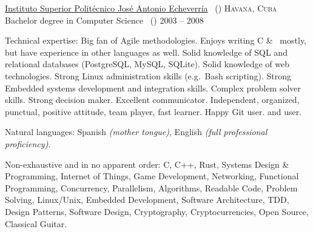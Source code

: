 \documentclass[10pt,a4paper]{article}
\begin{document}
                \headedsection
                        {\href{http://cujae.edu.cu}{Instituto Superior Polit\'ecnico Jos\'e Antonio Echeverr\'ia} \textnormal{~()}}
                        {\textsc{Havana, Cuba}} {%
                            \headedsubsection
                                    {Bachelor degree in Computer Science \textnormal{~()}}
                                    {2003 -- 2008}
                                    {}
                        }

                        \spacedhrule{0.5em}{-0.4em}


                        \inlineheadsection  %
                                {Technical expertise:}
                                {Big fan of Agile methodologies. Enjoys writing C \& \nsp\CPP\nsp\, mostly, but have experience in other languages as well. Solid knowledge of SQL and relational databases (PostgreSQL, MySQL, SQLite). Solid knowledge of web technologies. Strong Linux administration skills (e.g.\ Bash scripting). Strong Embedded systems development and integration skills. Complex problem solver skills. Strong decision maker. Excellent communicator. Independent, organized, punctual, positive attitude, team player, fast learner. Happy Git user.  and  user.}

                                \vspace{0.5em}
                                \inlineheadsection
                                        {Natural languages:}
                                        {Spanish \emph{(mother tongue)}, English \emph{(full professional proficiency)}.}

                                        \spacedhrule{1.6em}{-0.4em}


                                        \inlineheadsection
                                                {Non-exhaustive and in no apparent order:}
                                                {C, C++, Rust, Systems Design \& Programming, Internet of Things, Game Development, Networking, Functional Programming, Concurrency, Parallelism, Algorithms, Readable Code, Problem Solving, Linux/Unix, Embedded Development, Software Architecture, TDD, Design Patterns, Software Design, Cryptography, Cryptocurrencies, Open Source, Classical Guitar.}
\end{document}
